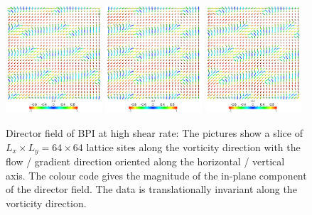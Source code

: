 \documentclass[aps,pre,reprint,superscriptaddress]{revtex4}
\begin{document}
\begin{figure}[h]
\includegraphics[width=0.32\textwidth]{dir+z-300k_run916.png}
\includegraphics[width=0.32\textwidth]{dir+z-301k_run916.png}
\includegraphics[width=0.32\textwidth]{dir+z-302k_run916.png}
\caption{Director field of BPI at high shear rate: The pictures show a slice of $L_x\times L_y = 64\times64$ lattice sites along the vorticity direction with the flow / gradient direction oriented along the horizontal / vertical axis. The colour code gives the magnitude of the in-plane component of the director field. The data is translationally invariant along the vorticity direction.}
\label{bp1-high}
\end{figure}
 
\end{document}
